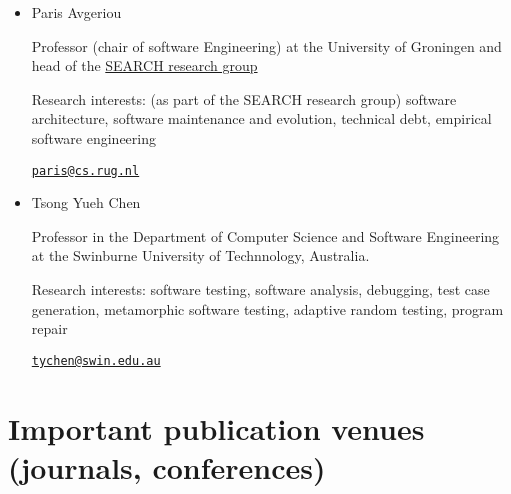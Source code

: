 \documentclass[a4paper]{article}
\begin{document}
\begin{itemize}
                \item 
                Paris Avgeriou
                
                Professor (chair of software Engineering) at the University of Groningen and head of the \href{https://search-rug.github.io/}{SEARCH research group}

                Research interests: (as part of the SEARCH research group) software architecture, software maintenance and evolution, technical debt, empirical software engineering

                \href{mailto:paris@cs.rug.nl}{\texttt{paris@cs.rug.nl}}


                \item 
                Tsong Yueh Chen
                
                Professor in the Department of Computer Science and Software Engineering at the Swinburne University of Technnology, Australia.

                Research interests: software testing, software analysis, debugging, test case generation, metamorphic software testing, adaptive random testing, program repair
                
                \href{mailto:tychen@swin.edu.au}{\texttt{tychen@swin.edu.au}}


            \end{itemize}

    \newpage
    \section{Important publication venues (journals, conferences)}
    
\end{document}
